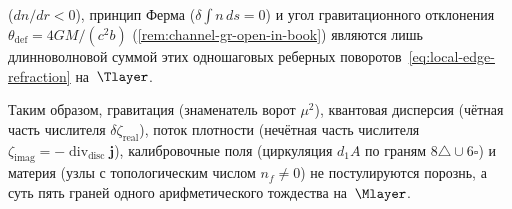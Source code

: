 \begin{remark}
\begin{enumerate}[label=(\arabic*)]
  ($dn/dr < 0$), принцип Ферма ($\delta\int n\,ds=0$) и угол гравитационного отклонения $\theta_{\mathrm{def}}=4GM/(c^2 b)$
  (\cref{rem:channel-gr-open-in-book}) являются лишь длинноволновой суммой этих одношаговых реберных поворотов~\eqref{eq:local-edge-refraction} на~$\Tlayer$.
\end{enumerate}
Таким образом, гравитация (знаменатель ворот $\mu^2$), квантовая дисперсия (чётная часть числителя $\delta\zeta_{\mathrm{real}}$),
поток плотности (нечётная часть числителя $\zeta_{\mathrm{imag}}=-\operatorname{div}_{\mathrm{disc}}\mathbf{j}$),
калибровочные поля (циркуляция $d_1 A$ по граням $8\triangle\cup 6\square$) и материя (узлы с топологическим
числом $n_f\ne 0$) не постулируются порознь, а суть пять граней одного арифметического тождества на~$\Mlayer$.
\end{remark}

